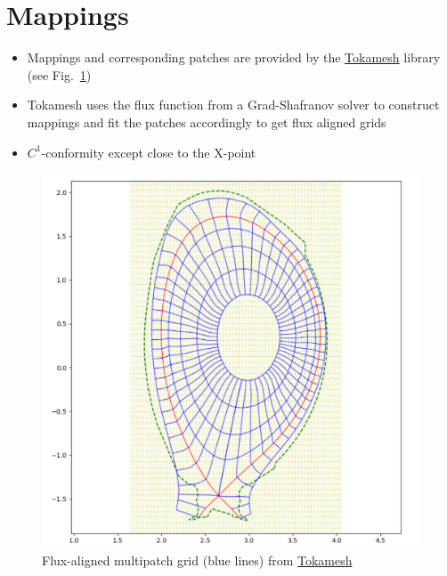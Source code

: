 \documentclass[presentation.tex]{subfiles}
\begin{document}
\section{Mappings}
\begin{itemize}
    \item Mappings and corresponding patches are provided by the \href{https://inria.hal.science/hal-01948060/document}{Tokamesh}
            library (see Fig.~\ref{fig:tokamesh_grid})
    \item Tokamesh uses the flux function from a Grad-Shafranov solver to construct mappings and 
            fit the patches accordingly to get flux aligned grids
    \item $C^1$-conformity except close to the X-point
\end{itemize}
\begin{figure}
    \centering
    \includegraphics[width=0.8 \textwidth]{images/tokamesh_grid.png}
    \caption{Flux-aligned multipatch grid (blue lines) 
             from \href{https://inria.hal.science/hal-01948060/document}{Tokamesh}}
    \label{fig:tokamesh_grid}
\end{figure}
\end{document}
